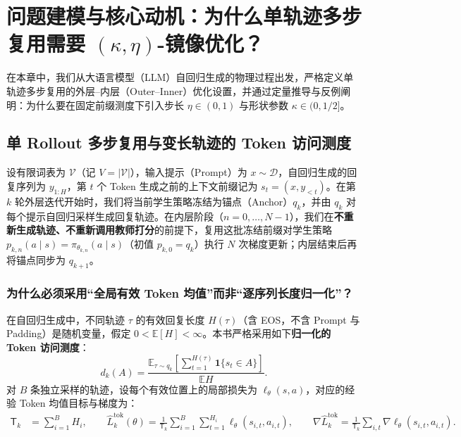 \documentclass[lang=cn,scheme=chinese,openany]{../book/elegantbook}
\newcommand{\E}{\mathbb E}
\begin{document}
\tableofcontents
\mainmatter

\chapter{问题建模与核心动机：为什么单轨迹多步复用需要 \texorpdfstring{$(\kappa,\eta)$}{(kappa, eta)}-镜像优化？}
\label{ch:motivation}

在本章中，我们从大语言模型（LLM）自回归生成的物理过程出发，严格定义单轨迹多步复用的外层--内层（Outer--Inner）优化设置，并通过定量推导与反例阐明：为什么要在固定前缀测度下引入步长 $\eta\in(0,1)$ 与形状参数 $\kappa\in(0,1/2]$。

\section{单 Rollout 多步复用与变长轨迹的 Token 访问测度}
\label{sec:prefix-measure-reduction}

设有限词表为 $\mathcal V$（记 $V=|\mathcal V|$），输入提示（Prompt）为 $x\sim\mathcal D$，自回归生成的回复序列为 $y_{1:H}$，第 $t$ 个 Token 生成之前的上下文前缀记为 $s_t=(x,y_{<t})$。在第 $k$ 轮外层迭代开始时，我们将当前学生策略冻结为锚点（Anchor）$q_k$，并由 $q_k$ 对每个提示自回归采样生成回复轨迹。在内层阶段（$n=0,\ldots,N-1$），我们在\textbf{不重新生成轨迹、不重新调用教师打分}的前提下，复用这批冻结前缀对学生策略 $p_{k,n}(a\mid s)=\pi_{\theta_{k,n}}(a\mid s)$（初值 $p_{k,0}=q_k$）执行 $N$ 次梯度更新；内层结束后再将锚点同步为 $q_{k+1}$。

\subsection{为什么必须采用“全局有效 Token 均值”而非“逐序列长度归一化”？}

在自回归生成中，不同轨迹 $\tau$ 的有效回复长度 $H(\tau)$（含 EOS，不含 Prompt 与 Padding）是随机变量，假定 $0<\E[H]<\infty$。本书严格采用如下\textbf{归一化的 Token 访问测度}：
\begin{equation}
 d_k(A)=\frac{\mathbb E_{\tau\sim q_k}
 \left[\sum_{t=1}^{H(\tau)}\mathbf1\{s_t\in A\}\right]}{\mathbb E H}.
\end{equation}
对 $B$ 条独立采样的轨迹，设每个有效位置上的局部损失为 $\ell_\theta(s,a)$，对应的经验 Token 均值目标与梯度为：
\begin{align}
 \mathsf T_k&=\sum_{i=1}^{B}H_i,\qquad
 \widehat L_k^{\mathrm{tok}}(\theta)
 =\frac1{\mathsf T_k}\sum_{i=1}^{B}\sum_{t=1}^{H_i}
 \ell_\theta(s_{i,t},a_{i,t}),\qquad
 \nabla\widehat L_k^{\mathrm{tok}}
 =\frac1{\mathsf T_k}\sum_{i,t}\nabla\ell_\theta(s_{i,t},a_{i,t}).
\end{align}
\end{document}
